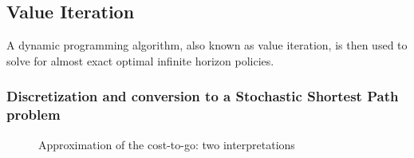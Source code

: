 \subsection{Value Iteration}
\label{sec:VI}

A dynamic programming algorithm, also known as value iteration, is then used to solve for almost exact optimal infinite horizon policies. 

\subsubsection{Discretization and conversion to a Stochastic Shortest Path problem}
\label{sec:ConvertionToAStocasticShortestPathProblem}

%
\begin{figure}[t]
        \centering
       \caption{Approximation of the cost-to-go: two interpretations }
			\label{fig:aaa}
			\vspace{-10pt}
\end{figure}
%


